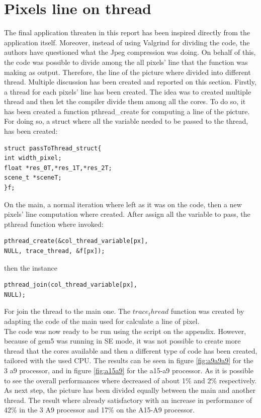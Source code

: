 \documentclass[journal]{IEEEtran}
\begin{document}
\section{Pixels line on thread}
The final application threaten in this report has been inspired directly from the application itself. Moreover, instead of using Valgrind for dividing the code, the authors have questioned what the Jpeg compression was doing. On behalf of this, the code was possible to divide among the all pixels’ line that the function was making as output. Therefore, the line of the picture where divided into different thread. Multiple discussion has been created and reported on this section.
Firstly, a thread for each pixels’ line has been created. The idea was to created multiple thread and then let the compiler divide them among all the cores. 
To do so, it has been created a function pthread\_create for computing a line of the picture.
For doing so, a struct where all the variable needed to be passed to the thread, has been created:
\begin{lstlisting}
struct passToThread_struct{
int width_pixel;
float *res_0T,*res_1T,*res_2T;
scene_t *sceneT;
}f;
\end{lstlisting}
On the main, a normal iteration where left as it was on the code, then a new pixels’ line computation where created. After assign all the variable to pass, the pthread function where invoked:
\begin{lstlisting}
pthread_create(&col_thread_variable[px],
NULL, trace_thread, &f[px]);
\end{lstlisting} 
then the instance 
\begin{lstlisting}
pthread_join(col_thread_variable[px], 
NULL);
\end{lstlisting}
For join the thread to the main one.
The \(trace_thread\) function was created by adapting the code of the main used for calculate a line of pixel.\\

The code was now ready to be run using the script on the appendix.
However, because of gem5 was running in SE mode, it was not possible to create more thread that the cores available and then a different type of code has been created, tailored with the used CPU.
The results can be seen in figure \ref{fig:a9a9a9} for the 3 a9 processor, and in figure \ref{fig:a15a9} for the a15-a9 processor. As it is possible to see the overall performances where decreased of about 1\% and 2\% respectively.
As next step, the picture has been divided equally between the main and another thread. The result where already satisfactory with an increase in performance of 42\% in the 3 A9 processor and 17\% on the A15-A9 processor.\\
\end{document}
